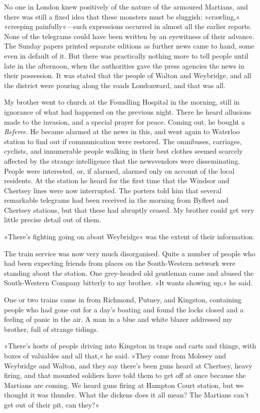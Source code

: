 No one in London knew positively of the nature of the armoured Martians, and there was still a fixed idea that these monsters must be sluggish: »crawling,« »creeping painfully«—such expressions occurred in almost all the earlier reports. None of the telegrams could have been written by an eyewitness of their advance. The Sunday papers printed separate editions as further news came to hand, some even in default of it. But there was practically nothing more to tell people until late in the afternoon, when the authorities gave the press agencies the news in their possession. It was stated that the people of Walton and Weybridge, and all the district were pouring along the roads Londonward, and that was all.

My brother went to church at the Foundling Hospital \label{brojourney2a} in the morning, still in ignorance of what had happened on the previous night. There he heard allusions made to the invasion, and a special prayer for peace. Coming out, he bought a \textit{Referee}. He became alarmed at the news in this, and went again to Waterloo station \label{brojourney1b} to find out if communication were restored. The omnibuses, carriages, cyclists, and innumerable people walking in their best clothes seemed scarcely affected by the strange intelligence that the newsvendors were disseminating. People were interested, or, if alarmed, alarmed only on account of the local residents. At the station he heard for the first time that the Windsor and Chertsey lines were now interrupted. The porters told him that several remarkable telegrams had been received in the morning from Byfleet and Chertsey stations, but that these had abruptly ceased. My brother could get very little precise detail out of them.

»There's fighting going on about Weybridge« was the extent of their information.

The train service was now very much disorganised. Quite a number of people who had been expecting friends from places on the South-Western network were standing about the station. One grey-headed old gentleman came and abused the South-Western Company bitterly to my brother. »It wants showing up,« he said.

One or two trains came in from Richmond, Putney, and Kingston, containing people who had gone out for a day's boating and found the locks closed and a feeling of panic in the air. A man in a blue and white blazer addressed my brother, full of strange tidings.

»There's hosts of people driving into Kingston in traps and carts and things, with boxes of valuables and all that,« he said. »They come from Molesey and Weybridge and Walton, and they say there's been guns heard at Chertsey, heavy firing, and that mounted soldiers have told them to get off at once because the Martians are coming. We heard guns firing at Hampton Court station, but we thought it was thunder. What the dickens does it all mean? The Martians can't get out of their pit, can they?«

